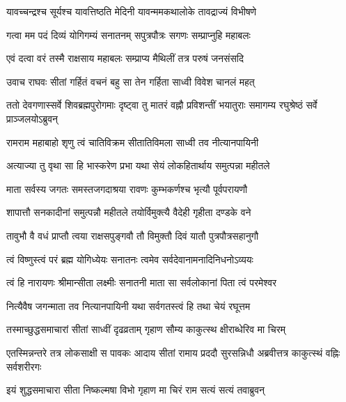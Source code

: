 
\twolineshloka
{यावच्चन्द्रश्च सूर्यश्च यावत्तिष्ठति मेदिनी}
{यावन्ममकथालोके तावद्राज्यं विभीषणे}%

\twolineshloka
{गत्वा मम पदं दिव्यं योगिगम्यं सनातनम्}
{सपुत्रपौत्रः सगणः सम्प्राप्नुहि महाबलः}%


\twolineshloka
{एवं दत्वा वरं तस्मै राक्षसाय महाबलः}
{सम्प्राप्य मैथिलीं तत्र परुषं जनसंसदि}%

\twolineshloka
{उवाच राघवः सीतां गर्हितं वचनं बहु}
{सा तेन गर्हिता साध्वी विवेश चानलं महत्}%


\threelineshloka
{ततो देवगणास्सर्वे शिवब्रह्मपुरोगमाः}
{दृष्ट्वा तु मातरं वह्नौ प्रविशन्तीं भयातुराः}
{समागम्य रघुश्रेष्ठं सर्वे प्राञ्जलयोऽब्रुवन्}%


\twolineshloka
{रामराम महाबाहो शृणु त्वं चातिविक्रम}
{सीतातिविमला साध्वी तव नीत्यानपायिनी}%

\twolineshloka
{अत्याज्या तु वृथा सा हि भास्करेण प्रभा यथा}
{सेयं लोकहितार्थाय समुत्पन्ना महीतले}%

\twolineshloka
{माता सर्वस्य जगतः समस्तजगदाश्रया}
{रावणः कुम्भकर्णश्च भृत्यौ पूर्वपरायणौ}%

\twolineshloka
{शापात्तौ सनकादीनां समुत्पन्नौ महीतले}
{तयोर्विमुक्त्यै वैदेही गृहीता दण्डके वने}%

\twolineshloka
{तावुभौ वै वधं प्राप्तौ त्वया राक्षसपुङ्गवौ}
{तौ विमुक्तौ दिवं यातौ पुत्रपौत्रसहानुगौ}%

\twolineshloka
{त्वं विष्णुस्त्वं परं ब्रह्म योगिध्येयः सनातनः}
{त्वमेव सर्वदेवानामनादिनिधनोऽव्ययः}%

\twolineshloka
{त्वं हि नारायणः श्रीमान्सीता लक्ष्मीः सनातनी}
{माता सा सर्वलोकानां पिता त्वं परमेश्वर}%

\twolineshloka
{नित्यैवैष जगन्माता तव नित्यानपायिनी}
{यथा सर्वगतस्त्वं हि तथा चेयं रघूत्तम}%

\twolineshloka
{तस्माच्छुद्धसमाचारां सीतां साध्वीं दृढव्रताम्}
{गृहाण सौम्य काकुत्स्थ क्षीराब्धेरिव मा चिरम्}%



\threelineshloka
{एतस्मिन्नन्तरे तत्र लोकसाक्षी स पावकः}
{आदाय सीतां रामाय प्रददौ सुरसन्निधौ}
{अब्रवीत्तत्र काकुत्स्थं वह्निः सर्वशरीरगः}%


\twolineshloka
{इयं शुद्धसमाचारा सीता निष्कल्मषा विभो}
{गृहाण मा चिरं राम सत्यं सत्यं तवाब्रुवन्}%

